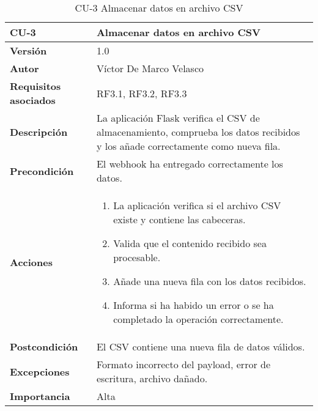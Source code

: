 \begin{table}[p]
	\centering
	\begin{tabularx}{\linewidth}{ p{} p{} }
		\toprule
		\textbf{CU-3}    & Almacenar datos en archivo CSV \\
		\toprule
		\textbf{Versión}              & 1.0 \\
		\textbf{Autor}                & Víctor De Marco Velasco \\
		\textbf{Requisitos asociados} & RF3.1, RF3.2, RF3.3 \\
		\textbf{Descripción}          & La aplicación Flask verifica el CSV de almacenamiento, comprueba los datos recibidos y los añade correctamente como nueva fila. \\
		\textbf{Precondición}         & El webhook ha entregado correctamente los datos. \\
		\textbf{Acciones}             &
		\begin{enumerate}
			\item La aplicación verifica si el archivo CSV existe y contiene las cabeceras.
			\item Valida que el contenido recibido sea procesable.
			\item Añade una nueva fila con los datos recibidos.
			\item Informa si ha habido un error o se ha completado la operación correctamente.
		\end{enumerate}\\
		\textbf{Postcondición}        & El CSV contiene una nueva fila de datos válidos. \\
		\textbf{Excepciones}          & Formato incorrecto del payload, error de escritura, archivo dañado. \\
		\textbf{Importancia}          & Alta \\
		\bottomrule
	\end{tabularx}
	\caption{CU-3 Almacenar datos en archivo CSV}
\end{table}
